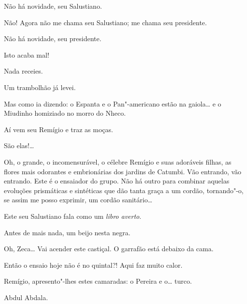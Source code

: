 \begin{linenumbers}
 Não há novidade, seu Salustiano.

 Não! Agora não me chama seu Salustiano; me chama seu
presidente.

 Não há novidade, seu presidente.

   Isto acaba mal!

 Nada receies.

 Um trambolhão já levei.

 Mas como ia dizendo: o Espanta e o Pan"-americano estão na
gaiola\ldots{} e o Miudinho homiziado no morro do Nheco.

  Aí vem seu Remígio e traz as moças.

 São elas!\ldots{}



  Oh, o grande, o
incomensurável, o célebre Remígio e suas adoráveis filhas, as flores mais
odorantes e embrionárias dos jardins de Catumbi. Vão entrando, vão entrando.
  Este é o
ensaiador do grupo. Não há outro para combinar aquelas evoluções prismáticas e
sintéticas que dão tanta graça a um cordão, tornando"-o, se assim me posso
exprimir, um cordão sanitário\ldots{} 

 Este seu Salustiano fala como um \textit{libro averto}.

 Antes de mais nada, um beijo nesta negra. 

 Oh, Zeca\ldots{} Vai acender este castiçal. O garrafão está
debaixo da cama. 

 Então o ensaio hoje não é no quintal?! Aqui faz muito calor.

 Remígio, apresento"-lhes estes camaradas: o Pereira e o\ldots{} 
turco.

 Abdul Abdala. 


\end{linenumbers}
